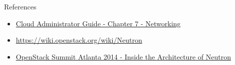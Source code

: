 \documentclass[english,serif,mathserif,xcolor=pdftex,dvipsnames,table]{beamer}
\begin{document}
\begin{frame}
  {References}
  \begin{itemize}
  \item \href{http://docs.openstack.org/admin-guide-cloud/content/ch_networking.html}{Cloud
      Administrator Guide - Chapter 7 - Networking}
  \item \url{https://wiki.openstack.org/wiki/Neutron}
  \item \href{http://www.confreaks.com/videos/3533-openstacksummitatl2014-inside-the-architecture-of-neutron}{OpenStack
      Summit Atlanta 2014 - Inside the Architecture of Neutron}

  \end{itemize}
\end{frame}


\end{document}
